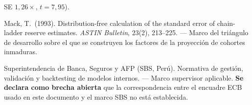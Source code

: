 \documentclass[12pt, a4paper]{article}
\begin{document}
\begin{enumerate}[label={[\arabic*]}]
    SE $1{,}26\times$, $t=7{,}95$).
  \item Mack, T.\ (1993). Distribution-free calculation of the standard error of
    chain-ladder reserve estimates. \emph{ASTIN Bulletin}, 23(2), 213--225. --- Marco del triángulo
    de desarrollo sobre el que se construyen los factores de la proyección de cohortes inmaduras.
  \item Superintendencia de Banca, Seguros y AFP (SBS, Perú). Normativa de gestión,
    validación y backtesting de modelos internos. --- Marco supervisor aplicable. \textbf{Se declara
    como brecha abierta} que la correspondencia entre el encuadre ECB usado en este documento y el
    marco SBS no está establecida.
\end{enumerate}
\end{document}
